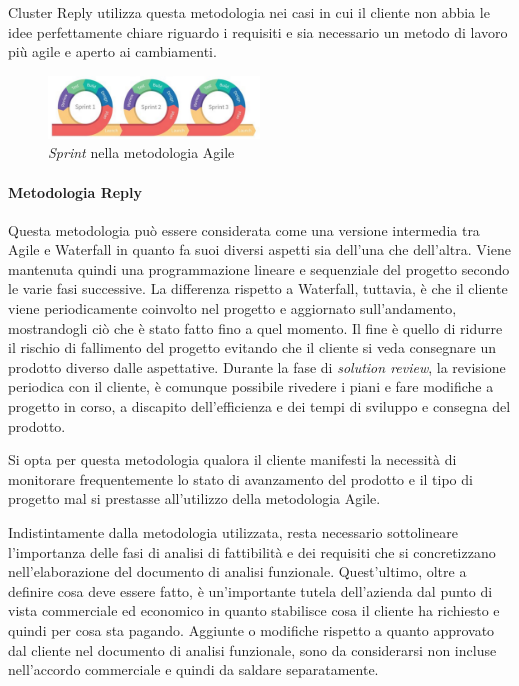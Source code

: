 Cluster Reply utilizza questa metodologia nei casi in cui il cliente non abbia le idee perfettamente chiare riguardo i requisiti e sia necessario un metodo di lavoro più agile e aperto ai cambiamenti.

\begin{figure}[ht]
  \centering
  \includegraphics[width=0.50\textwidth]{agile.png}
  \caption{\textit{Sprint} nella metodologia Agile}
  \label{fig:sprintAgile}
\end{figure}

\paragraph{Metodologia Reply} Questa metodologia può essere considerata come una versione intermedia tra Agile e Waterfall in quanto fa suoi diversi aspetti sia dell'una che dell'altra. Viene mantenuta quindi una programmazione lineare e sequenziale del progetto secondo le varie fasi successive. La differenza rispetto a Waterfall, tuttavia, è che il cliente viene periodicamente coinvolto nel progetto e aggiornato sull'andamento, mostrandogli ciò che è stato fatto fino a quel momento. Il fine è quello di ridurre il rischio di fallimento del progetto evitando che il cliente si veda consegnare un prodotto diverso dalle aspettative. Durante la fase di \textit{solution review}, la revisione periodica con il cliente, è comunque possibile rivedere i piani e fare modifiche a progetto in corso, a discapito dell'efficienza e dei tempi di sviluppo e consegna del prodotto.

Si opta per questa metodologia qualora il cliente manifesti la necessità di monitorare frequentemente lo stato di avanzamento del prodotto e il tipo di progetto mal si prestasse all'utilizzo della metodologia Agile.

\setlength{\parskip}{2em}
Indistintamente dalla metodologia utilizzata, resta necessario sottolineare l'importanza delle fasi di analisi di fattibilità e dei requisiti che si concretizzano nell'elaborazione del documento di analisi funzionale. Quest'ultimo, oltre a definire cosa deve essere fatto, è un'importante tutela dell'azienda dal punto di vista commerciale ed economico in quanto stabilisce cosa il cliente ha richiesto e quindi per cosa sta pagando. Aggiunte o modifiche rispetto a quanto approvato dal cliente nel documento di analisi funzionale, sono da considerarsi non incluse nell'accordo commerciale e quindi da saldare separatamente.
\setlength{\parskip}{0em}


